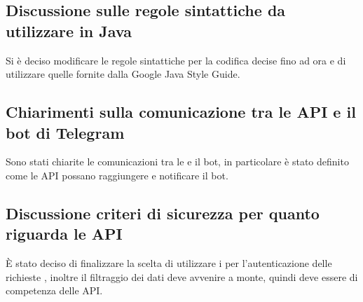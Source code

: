 	\subsection*{Discussione sulle regole sintattiche da utilizzare in Java}
		Si è deciso modificare le regole sintattiche per la codifica decise fino ad ora e di utilizzare quelle fornite dalla Google Java Style Guide.

	\subsection*{Chiarimenti sulla comunicazione tra le API e il bot di Telegram}
		Sono stati chiarite le comunicazioni tra le  e il bot, in particolare è stato definito come le API possano raggiungere e notificare il bot.

	\subsection*{Discussione criteri di sicurezza per quanto riguarda le API}
		È stato deciso di finalizzare la scelta di utilizzare i  per l'autenticazione delle richieste , inoltre il filtraggio dei dati deve avvenire a monte, quindi deve essere di competenza delle API.
